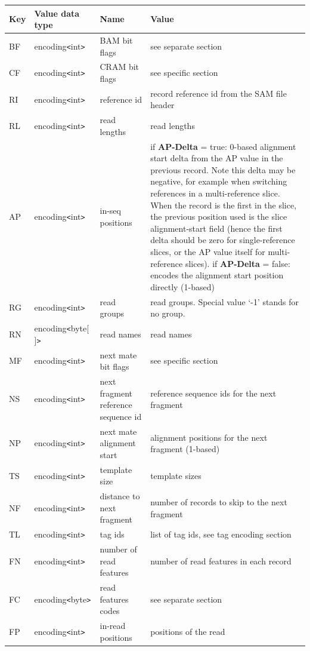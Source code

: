 \documentclass[a4paper]{article}
\begin{document}
\begin{threeparttable}[t]
\begin{tabular}{|l|l|>{\raggedright}p{100pt}|>{\raggedright}p{220pt}|}
\hline
\textbf{Key} & \textbf{Value data type} & \textbf{Name} & \textbf{Value}\tabularnewline
\hline
BF & encoding\texttt{<}int\texttt{>} & BAM bit flags & see separate section\tabularnewline
\hline
CF & encoding\texttt{<}int\texttt{>} & CRAM bit flags & see specific section\tabularnewline
\hline
RI & encoding\texttt{<}int\texttt{>} & reference id & record reference id from
the SAM file header\tabularnewline
\hline
RL & encoding\texttt{<}int\texttt{>} & read lengths & read lengths\tabularnewline
\hline
AP & encoding\texttt{<}int\texttt{>} & in-seq positions & if \textbf{AP-Delta} = true: 0-based alignment start
delta from the AP value in the previous record.
Note this delta may be negative, for example when switching references in a multi-reference slice.
When the record is the first in the slice, the previous position used is the slice alignment-start field (hence the first delta should be zero for single-reference slices, or the AP value itself for multi-reference slices).  \linebreak{}
if \textbf{AP-Delta} = false: encodes the alignment start position directly (1-based)\tabularnewline
\hline
RG & encoding\texttt{<}int\texttt{>} & read groups & read groups. Special value 
`-1' stands for no group.\tabularnewline
\hline
RN\tnote{a} & encoding\texttt{<}byte[ ]\texttt{>} & read names & read names\tabularnewline
\hline
MF & encoding\texttt{<}int\texttt{>} & next mate bit flags & see specific section\tabularnewline
\hline
NS & encoding\texttt{<}int\texttt{>} & next fragment reference sequence id & reference 
sequence ids for the next fragment \tabularnewline
\hline
NP & encoding\texttt{<}int\texttt{>} & next mate alignment start & alignment positions 
for the next fragment (1-based)\tabularnewline
\hline
TS & encoding\texttt{<}int\texttt{>} & template size & template sizes\tabularnewline
\hline
NF & encoding\texttt{<}int\texttt{>} & distance to next fragment & number of records
to skip to the next fragment\tnote{b}\tabularnewline
\hline
TL\tnote{c} & encoding\texttt{<}int\texttt{>} & tag ids  & list of tag ids, see tag encoding
section\tabularnewline
\hline
FN & encoding\texttt{<}int\texttt{>} & number of read features & number of read
features in each record\tabularnewline
\hline
FC & encoding\texttt{<}byte\texttt{>} & read features codes & see separate section\tabularnewline
\hline
FP & encoding\texttt{<}int\texttt{>} & in-read positions & positions of the read

\end{tabular}
\end{threeparttable}
\end{document}
